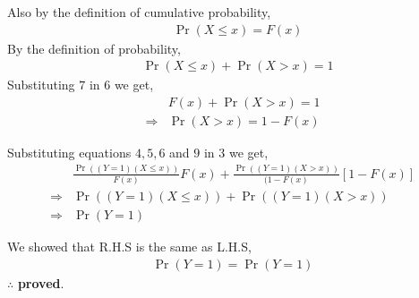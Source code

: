\documentclass{beamer}
\providecommand{\pr}[1]{\ensuremath{\Pr\left(#1\right)}}
\begin{document}
    \begin{frame}
    Also by the definition of cumulative probability,
\begin{align}
    &\pr{X \leq x}=F(x) 
    \end{align}
By the definition of probability,    
    \begin{align}
    &\pr{X \leq x}+\pr{X>x}=1 
    \end{align}
   Substituting $7$ in $6$ we get,
\begin{align}
    &F(x)+\pr{X>x}=1 \\
    \Rightarrow &\pr{X>x}=1-F(x) 
\end{align}
\end{frame}
\begin{frame}
    Substituting equations $4,5,6$ and $9$ in 3 we get,
\begin{align}
&\frac{\pr{(Y=1)(X\leq x)}}{F(x)}F(x)+ \frac{\pr{(Y=1)(X>x)}}{(1-F(x)}[1-F(x)] \\
\Rightarrow &\pr{(Y=1)(X\leq x)} + \pr{(Y=1)(X>x)}\\
\Rightarrow&\pr{Y=1}
\end{align}
\end{frame}
\begin{frame}
We showed that R.H.S is the same as L.H.S,
\begin{align}
    \pr{Y=1}=\pr{Y=1}
\end{align}
    \centering
       $\therefore$ \textbf{proved}.
\end{frame}         
     
     
     
\end{document}
